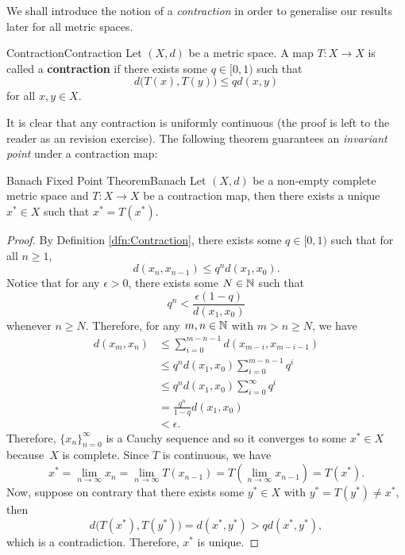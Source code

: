 \documentclass[math, code]{amznotes}
\theoremstyle{remark}
\begin{document}
We shall introduce the notion of a \textit{contraction} in order to generalise our results later for all metric spaces.
\begin{dfnbox}{Contraction}{Contraction}
    Let $(X, d)$ be a metric space. A map $T \colon X \to X$ is called a {\color{red} \textbf{contraction}} if there exists some $q \in [0, 1)$ such that 
    \begin{equation*}
        d\bigl(T(x), T(y)\bigr) \leq qd(x, y)
    \end{equation*}
    for all $x, y \in X$.
\end{dfnbox}
It is clear that any contraction is uniformly continuous (the proof is left to the reader as an revision exercise). The following theorem guarantees an \textit{invariant point} under a contraction map:
\begin{thmbox}{Banach Fixed Point Theorem}{Banach}
    Let $(X, d)$ be a non-empty complete metric space and $T \colon X \to X$ be a contraction map, then there exists a unique $x^* \in X$ such that $x^* = T(x^*)$.
    \tcblower
    \begin{proof}
        By Definition \ref{dfn:Contraction}, there exists some $q \in [0, 1)$ such that for all $n \geq 1$,
        \begin{equation*}
            d(x_n, x_{n - 1}) \leq q^nd(x_1, x_0).
        \end{equation*}
        Notice that for any $\epsilon > 0$, there exists some $N \in \mathbb{N}$ such that 
        \begin{equation*}
            q^n < \frac{\epsilon(1 - q)}{d(x_1, x_0)}
        \end{equation*}
        whenever $n \geq N$. Therefore, for any $m, n \in \mathbb{N}$ with $m > n \geq N$, we have 
        \begin{align*}
            d(x_m, x_n) & \leq \sum_{i = 0}^{m - n - 1}d(x_{m - i}, x_{m - i - 1}) \\
            & \leq q^nd(x_1, x_0)\sum_{i = 0}^{m - n - 1}q^i \\
            & \leq q^nd(x_1, x_0)\sum_{i = 0}^{\infty}q^i \\
            & = \frac{q^n}{1 - q}d(x_1, x_0) \\
            & < \epsilon.
        \end{align*}
        Therefore, $\{x_n\}_{n = 0}^{\infty}$ is a Cauchy sequence and so it converges to some $x^* \in X$ because~$X$ is complete. Since $T$ is continuous, we have
        \begin{equation*}
            x^* = \lim_{n \to \infty}x_n = \lim_{n \to \infty}T(x_{n - 1}) = T\left(\lim_{n \to \infty}x_{n - 1}\right) = T(x^*).
        \end{equation*}
        Now, suppose on contrary that there exists some $y^* \in X$ with $y^* = T(y^*) \neq x^*$, then 
        \begin{equation*}
            d\bigl(T(x^*), T(y^*)\bigr) = d(x^*, y^*) > qd(x^*, y^*),
        \end{equation*}
        which is a contradiction. Therefore, $x^*$ is unique.
    \end{proof}
\end{thmbox}
\end{document}
